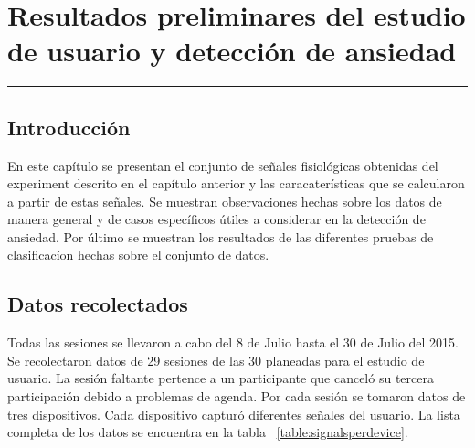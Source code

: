 
\chapter{Resultados preliminares del estudio de usuario y detecci\'on de ansiedad}\label{capit:cap4}
\vspace{-2.0325ex}%
\noindent
\rule{\textwidth}{0.5pt}
\vspace{-5.5ex}%
\newcommand{\pushline}{\Indp}%

\section{Introducci\'on}\label{cap4:intro}
En este cap\'itulo se presentan el conjunto de se\~nales fisiol\'ogicas obtenidas del experiment descrito en el cap\'itulo anterior y las caracater\'isticas que se calcularon a partir de estas se\~nales. Se muestran observaciones hechas sobre los datos de manera general y de casos espec\'ificos \'utiles a considerar en la detecci\'on de ansiedad. Por \'ultimo se muestran los resultados de las diferentes pruebas de clasificac\'ion hechas sobre el conjunto de datos.

\section{Datos recolectados}
Todas las sesiones se llevaron a cabo del 8 de Julio hasta el 30 de Julio del 2015. Se recolectaron datos de 29 sesiones de las 30 planeadas para el estudio de usuario. La sesi\'on faltante pertence a un participante que cancel\'o su tercera participaci\'on debido a problemas de agenda. Por cada sesi\'on se tomaron datos de tres dispositivos. Cada dispositivo captur\'o diferentes se\~nales del usuario. La lista completa de los datos se encuentra en la tabla ~\ref{table:signalsperdevice}.

